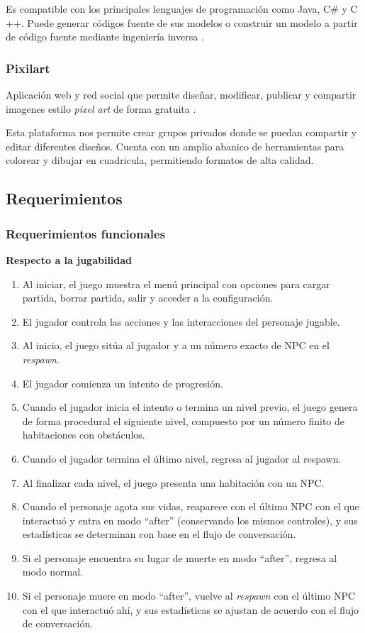 \documentclass[12pt,twoside]{article}
\begin{document}
	Es compatible con los principales lenguajes de programación como Java, C\# y C ++. Puede generar códigos fuente de sus modelos o construir un modelo a partir de código fuente mediante ingeniería	inversa \cite{app: star}. 
	
	\subsubsection{Pixilart}
	Aplicación web y red social que permite diseñar, modificar, publicar y compartir imagenes estilo \textit{pixel art} de forma gratuita \cite{app: pixilart}.
	
	Esta plataforma nos permite crear grupos privados donde se puedan compartir y editar diferentes diseños. Cuenta con un amplio abanico de herramientas para colorear y dibujar en cuadricula, permitiendo formatos de alta calidad.
	
	\clearpage
	\subsection{Requerimientos}
	
	\subsubsection{Requerimientos funcionales}
	\textbf{Respecto a la jugabilidad} 
	\begin{enumerate}[label=RF\arabic*]
		\item Al iniciar, el juego muestra el menú principal con opciones para cargar partida, borrar partida, salir y acceder a la configuración.
		\item El jugador controla las acciones y las interacciones del personaje jugable.
		\item Al inicio, el juego sitúa al jugador y a un número exacto de NPC en el \textit{respawn}.
		\item El jugador comienza un intento de progresión.
		\item Cuando el jugador inicia el intento o termina un nivel previo, el juego genera de forma procedural el siguiente nivel, compuesto por un número finito de habitaciones con obstáculos.
		\item Cuando el jugador termina el último nivel, regresa al jugador al respawn.
		\item Al finalizar cada nivel, el juego presenta una habitación con un NPC.
		\item Cuando el personaje agota sus vidas, reaparece con el último NPC con el que interactuó y entra en modo ``after'' (conservando los mismos controles), y sus estadísticas se determinan con base en el flujo de conversación.
		\item Si el personaje encuentra su lugar de muerte en modo ``after'', regresa al modo normal.
		\item Si el personaje muere en modo ``after'', vuelve al \textit{respawn} con el último NPC con el que interactuó ahí, y sus estadísticas se ajustan de acuerdo con el flujo de conversación.
	\end{enumerate}	
	
\end{document}
